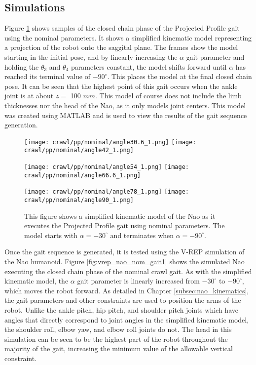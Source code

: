 \subsection{Simulations}
Figure \ref{fig:pp_nom_gait1} shows samples of the closed chain phase of the Projected
Profile gait using the nominal parameters. It shows a simplified kinematic model
representing a projection of the robot onto the saggital plane. The frames show the
model starting in the initial pose, and by linearly increasing the $\alpha$ gait
parameter and holding the $\theta_3$ and $\theta_4$ parameters constant, the model
shifts forward until $\alpha$ has reached its terminal value of $-90^\circ$. This places the model
at the final closed chain pose. It can be seen that the highest point of this gait occurs
when the ankle joint is at about $z =$ 100 $mm$. This model of course does not include the limb thicknesses nor
the head of the Nao, as it only models joint centers. This model was created using MATLAB
and is used to view the results of the gait sequence generation.

\begin{figure}
  \centerline{
    \texttt{[image: crawl/pp/nominal/angle30.6\_1.png]}
    \texttt{[image: crawl/pp/nominal/angle42\_1.png]}
  }
  \centerline{
    \texttt{[image: crawl/pp/nominal/angle54\_1.png]}
    \texttt{[image: crawl/pp/nominal/angle66.6\_1.png]}
  }
  \centerline{
    \texttt{[image: crawl/pp/nominal/angle78\_1.png]}
    \texttt{[image: crawl/pp/nominal/angle90\_1.png]}
  }
  \caption{This figure shows a simplified kinematic model of the Nao as it executes
           the Projected Profile gait using nominal parameters. The model starts with
           $\alpha = -30^\circ$ and terminates when $\alpha = -90^\circ$.}
  \label{fig:pp_nom_gait1}
\end{figure}


Once the gait sequence is generated, it is tested using the V-REP simulation of the
Nao humanoid. Figure \ref{fig:vrep_nao_nom_gait1} shows the simulated Nao executing
the closed chain phase of the nominal crawl gait. As with the simplified kinematic
model, the $\alpha$ gait parameter is linearly increased from $-30^\circ$ to $-90^\circ$,
which moves the robot forward. As detailed in Chapter \ref{subsec:nao_kinematics}, the
gait parameters and other constraints are used to position the arms of the robot. Unlike
the ankle pitch, hip pitch, and shoulder pitch joints which have angles that directly correspond to
joint angles in the simplified kinematic model, the shoulder roll, elbow yaw, and elbow roll joints
do not. The head in this simulation can be seen to be the highest part of the robot
throughout the majority of the gait, increasing the minimum value of the allowable
vertical constraint.

